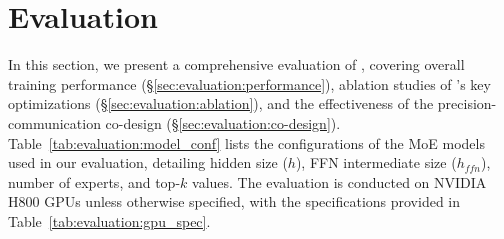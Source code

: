 \section{Evaluation}
\label{sec:evaluation}

In this section, we present a comprehensive evaluation of \sysname, covering overall training performance (\S\ref{sec:evaluation:performance}), ablation studies of \sysname's key optimizations (\S\ref{sec:evaluation:ablation}), and the effectiveness of the precision-communication co-design (\S\ref{sec:evaluation:co-design}). Table~\ref{tab:evaluation:model_conf} lists the configurations of the MoE models used in our evaluation, detailing hidden size ($h$), FFN intermediate size ($h_{ffn}$), number of experts, and top-$k$ values. 
The evaluation is conducted on NVIDIA H800 GPUs unless otherwise specified, with the specifications provided in Table~\ref{tab:evaluation:gpu_spec}. 

